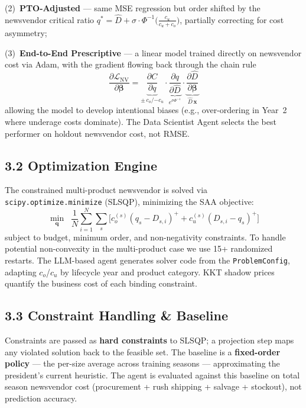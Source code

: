 \documentclass[11pt]{article}
\begin{document}
(2)~\textbf{PTO-Adjusted} --- same MSE regression but order shifted by the newsvendor critical ratio
$q^* = \hat{D} + \sigma \cdot \Phi^{-1}\!\bigl(\tfrac{c_u}{c_u+c_o}\bigr)$, partially correcting for
cost asymmetry;

(3)~\textbf{End-to-End Prescriptive} --- a linear model trained directly on newsvendor cost via Adam,
with the gradient flowing back through the chain rule
\[
          \frac{\partial \mathcal{L}_{\text{NV}}}{\partial \boldsymbol{\beta}}
          = \underbrace{\frac{\partial C}{\partial q}}_{\pm\, c_o / {-c_u}}
          \cdot \underbrace{\frac{\partial q}{\partial \hat{D}}}_{e^{\sigma \Phi^{-1}}}
          \cdot \underbrace{\frac{\partial \hat{D}}{\partial \boldsymbol{\beta}}}_{\hat{D}\,\mathbf{x}}
\]
allowing the model to develop intentional biases (e.g., over-ordering in Year~2 where underage costs
dominate). The Data Scientist Agent selects the best performer on holdout newsvendor cost, not RMSE.

\subsection*{3.2 \; Optimization Engine}

The constrained multi-product newsvendor is solved via \texttt{scipy.optimize.minimize} (SLSQP),
minimizing the SAA objective:
\[
  \min_{\mathbf{q}} \;\; \frac{1}{N} \sum_{i=1}^{N} \sum_{s} \bigl[c_o^{(s)}(q_s - D_{s,i})^+ + c_u^{(s)}(D_{s,i} - q_s)^+\bigr]
\]
subject to budget, minimum order, and non-negativity constraints. To handle potential non-convexity
in the multi-product case we use 15+ randomized restarts. The LLM-based agent generates solver code
from the \texttt{ProblemConfig}, adapting $c_o$/$c_u$ by lifecycle year and product category. KKT
shadow prices quantify the business cost of each binding constraint.

\subsection*{3.3 \; Constraint Handling \& Baseline}

Constraints are passed as \textbf{hard constraints} to SLSQP; a projection step maps any violated
solution back to the feasible set. The baseline is a \textbf{fixed-order policy} --- the per-size
average across training seasons --- approximating the president's current heuristic. The agent is
evaluated against this baseline on total season newsvendor cost (procurement + rush shipping + salvage
+ stockout), not prediction accuracy.
\end{document}
